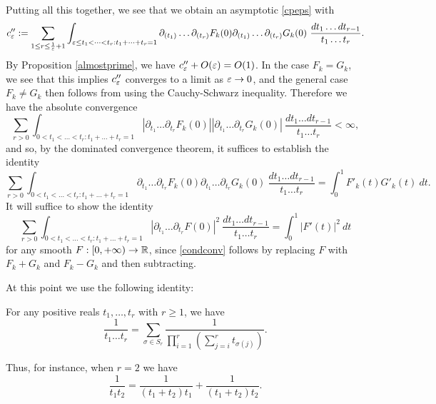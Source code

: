 Putting all this together, we see that we obtain an asymptotic \eqref{cpeps} with
$$ c''_\varepsilon := \sum_{1 \leq r \leq \frac{1}{\varepsilon}+1} 
\int_{\varepsilon \leq t_1 < \dots < t_r: t_1 + \dots + t_r = 1} \partial_{(t_1)} \dots \partial_{(t_r)} F_k(0)
\partial_{(t_1)} \dots \partial_{(t_r)} G_k(0)\ \frac{dt_1 \dots dt_{r-1}}{t_1 \dots t_r}.$$
By Proposition \ref{almostprime}, we have $c''_\varepsilon+O(\varepsilon)=O(1)$. In the case $F_k=G_k$, we see that this implies $c''_\varepsilon$ converges to a limit as $\varepsilon\rightarrow 0$, and the general case $F_k\ne G_k$ then follows from using the Cauchy-Schwarz inequality. Therefore we have the absolute convergence
\begin{equation}\label{absconv}
 \sum_{r>0} \int_{0 < t_1 < \dots < t_r: t_1 + \dots + t_r = 1} |\partial_{t_1} \dots \partial_{t_r} F_k(0)|
|\partial_{t_1} \dots \partial_{t_r} G_k(0)|\ \frac{dt_1 \dots dt_{r-1}}{t_1 \dots t_r} < \infty,
\end{equation}
and so, by the dominated convergence theorem, it suffices to establish the identity
\begin{equation}\label{condconv}
 \sum_{r>0} \int_{0 < t_1 < \dots < t_r: t_1 + \dots + t_r = 1} \partial_{t_1} \dots \partial_{t_r} F_k(0)
\partial_{t_1} \dots \partial_{t_r} G_k(0)\ \frac{dt_1 \dots dt_{r-1}}{t_1 \dots t_r} = \int_0^1 F'_k(t) G'_k(t)\ dt.
\end{equation}
It will suffice to show the identity
\begin{equation}\label{depol}
 \sum_{r>0} \int_{0 < t_1 < \dots < t_r: t_1 + \dots + t_r = 1} |\partial_{t_1} \dots \partial_{t_r} F(0)|^2\ \frac{dt_1 \dots dt_{r-1}}{t_1 \dots t_r} = \int_0^1 |F'(t)|^2\ dt
\end{equation}
for any smooth $F: [0,+\infty) \to \mathbb{R}$, since \eqref{condconv} follows by replacing $F$ with $F_k+G_k$ and $F_k-G_k$ and then subtracting.

At this point we use the following identity:

\begin{lemma}  For any positive reals $t_1,\dots,t_r$ with $r \geq 1$, we have
\begin{equation}\label{star}
 \frac{1}{t_1 \dots t_r} = \sum_{\sigma \in S_r} \frac{1}{\prod_{i=1}^r (\sum_{j=i}^r t_{\sigma(j)})}.
\end{equation}
\end{lemma}
Thus, for instance, when $r=2$ we have
$$ \frac{1}{t_1 t_2} = \frac{1}{(t_1+t_2) t_1} + \frac{1}{(t_1+t_2)t_2}.$$


